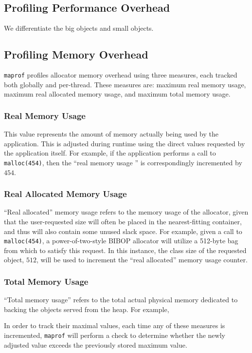 \subsection{Profiling Performance Overhead}

We differentiate the big objects and small objects. 

\subsection{Profiling Memory Overhead}
\texttt{maprof} profiles allocator memory overhead using three measures, each tracked both globally and per-thread. These measures are: maximum real memory usage, maximum real allocated memory usage, and maximum total memory usage.

\subsubsection{Real Memory Usage}
This value represents the amount of memory actually being used by the application. This is adjusted during runtime using the direct values requested by the application itself. For example, if the application performs a call to \texttt{malloc(454)}, then the ``real memory usage '' is correspondingly incremented by $454$.

\subsubsection{Real Allocated Memory Usage}
``Real allocated'' memory usage refers to the memory usage of the allocator, given that the user-requested size will often be placed in the nearest-fitting container, and thus will also contain some unused slack space. For example, given a call to \texttt{malloc(454)}, a power-of-two-style BIBOP allocator will utilize a 512-byte bag from which to satisfy this request. In this instance, the class size of the requested object, $512$, will be used to increment the ``real allocated'' memory usage counter.

\subsubsection{Total Memory Usage}
``Total memory usage'' refers to the total actual physical memory dedicated to backing the objects served from the heap. For example, 

In order to track their maximal values, each time any of these measures is incremented, \texttt{maprof} will perform a check to determine whether the newly adjusted value exceeds the previously stored maximum value.

